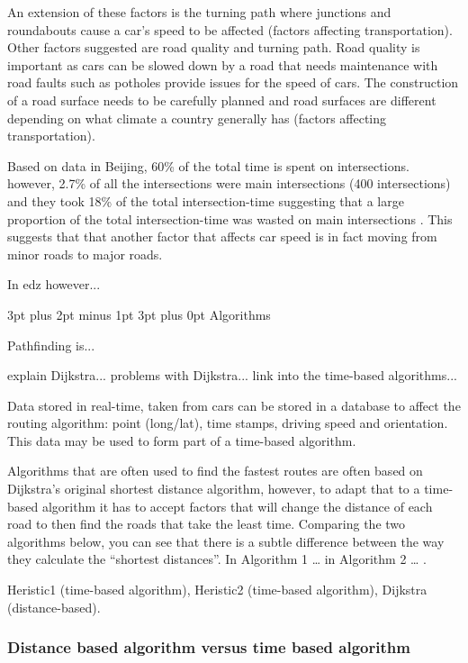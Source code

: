 \documentclass[12pt,a4paper]{article}
\makeatletter
\renewcommand\subsection{\@startsection {subsection}{1}{0mm} %
                               {3pt plus 2pt minus 1pt} %
                               {3pt plus 0pt} %
                               {\normalfont\bfseries}}
\makeatother
\begin{document}
An extension of these factors is the turning path where junctions and roundabouts cause a car’s speed to be affected (factors affecting transportation). Other factors suggested are road quality and turning path. Road quality is important as cars can be slowed down by a road that needs maintenance with road faults such as potholes provide issues for the speed of cars. The construction of a road surface needs to be carefully planned and road surfaces are different depending on what climate a country generally has (factors affecting transportation). 

Based on data in Beijing, 60\% of the total time is spent on intersections. however, 2.7\% of all the intersections were main intersections (400 intersections) and they took 18\% of the total intersection-time suggesting that a large proportion of the total intersection-time was wasted on main intersections \cite{Liu}. This suggests that that another factor that affects car speed is in fact moving from minor roads to major roads. 

In edz however...

\subsection{Algorithms}

Pathfinding is...

explain Dijkstra...
problems with Dijkstra... link into the time-based algorithms...

Data stored in real-time, taken from cars can be stored in a database to affect the routing algorithm: point (long/lat), time stamps, driving speed and orientation\cite{Zheng2018}. This data may be used to form part of a time-based algorithm.

Algorithms that are often used to find the fastest routes are often based on Dijkstra’s original shortest distance algorithm, however, to adapt that to a time-based algorithm it has to accept factors that will change the distance of each road to then find the roads that take the least time. Comparing the two algorithms below, you can see that there is a subtle difference between the way they calculate the “shortest distances”. In Algorithm 1 … in Algorithm 2 … \cite{Zheng2018}.

Heristic1 (time-based algorithm), Heristic2 (time-based algorithm), Dijkstra (distance-based). \cite{Zheng2018}



\subsubsection{Distance based algorithm versus time based algorithm}
\end{document}
